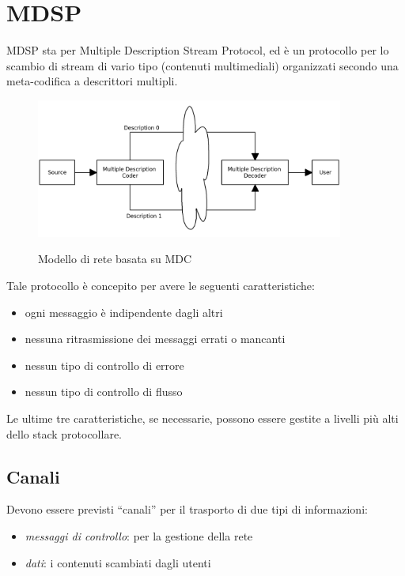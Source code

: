 \section{MDSP}


MDSP sta per Multiple Description Stream Protocol, ed è un protocollo per lo
scambio di stream di vario tipo (contenuti multimediali) organizzati secondo una
meta-codifica a descrittori multipli.

\begin{figure}[hb]
\includegraphics[width=0.90\textwidth]{../images/network_mdc.png}
\label{fig:network_mdc}
\caption{Modello di rete basata su MDC}
\end{figure}

Tale protocollo è concepito per avere le seguenti caratteristiche:
\begin{itemize}
  \item ogni messaggio è indipendente dagli altri
  \item nessuna ritrasmissione dei messaggi errati o mancanti
  \item nessun tipo di controllo di errore
  \item nessun tipo di controllo di flusso 
\end{itemize}

Le ultime tre caratteristiche, se necessarie, possono essere gestite a livelli
più alti dello stack protocollare.



\subsection{Canali}
Devono essere previsti ``canali'' per il trasporto di due tipi di informazioni:
\begin{itemize}
  \item \emph{messaggi di controllo}: per la gestione della rete
  \item \emph{dati}: i contenuti scambiati dagli utenti
\end{itemize}







